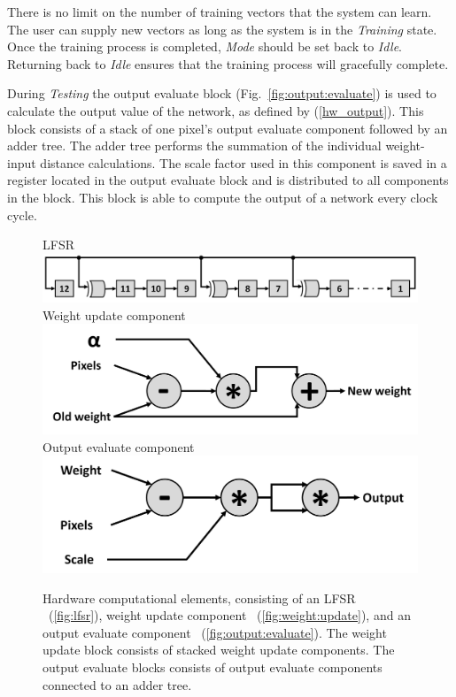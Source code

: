 \documentclass[10pt,journal]{IEEEtran}
\newcommand{\fig}[1]{Fig.~\ref{#1}}
\newcommand{\subfig}[1]{~(\ref{#1})}
\newcommand{\eq}[1]{(\ref{#1})}
\begin{document}
			There is no limit on the number of training vectors that the system can learn. The user can supply new vectors as long as the system is in the \textit{Training} state. Once the training process is completed, \textit{Mode} should be set back to \textit{Idle}. Returning back to \textit{Idle} ensures that the training process will gracefully complete.
			
			During \textit{Testing} the output evaluate block (\fig{fig:output:evaluate}) is used to calculate the output value of the network, as defined by \eq{hw_output}. This block consists of a stack of one pixel's output evaluate component followed by an adder tree. The adder tree performs the summation of the individual weight-input distance calculations. The scale factor used in this component is saved in a register located in the output evaluate block and is distributed to all components in the block. This block is able to compute the output of a network every clock cycle.
			
			\begin{figure}[h]
				\captionsetup[subfigure]{position=b}
				\centering
				\hfill
				\subcaptionbox
				{
					LFSR
					\label{fig:lfsr}
				}
				{\includegraphics[width=0.9\columnwidth]{LFSR}}
				\hfill
				\subcaptionbox
				{
					Weight update component
					\label{fig:weight:update}
				}
				{\includegraphics[width=0.9\columnwidth]{Weight_update}}
				\hfill
				\subcaptionbox
				{
					Output evaluate component
					\label{fig:output:evaluate}
				}
				{\includegraphics[width=0.9\columnwidth]{Ouput_evaluate}}
				\hfill
				\caption{Hardware computational elements, consisting of an LFSR \subfig{fig:lfsr}, weight update component \subfig{fig:weight:update}, and an output evaluate component \subfig{fig:output:evaluate}. The weight update block consists of stacked weight update components. The output evaluate blocks consists of output evaluate components connected to an adder tree.}
				\label{fig:computational_elements}
			\end{figure}
			
\end{document}
